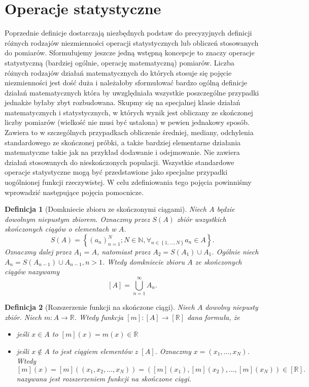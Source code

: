\documentclass[12pt,a4paper]{report}
\newtheorem{definition}{Definicja}[chapter]
\newcommand{\zbior}[1]{\left\lbrace {#1} \right\rbrace }
\newcommand{\domkniecie}[1]{\left\lbrack{#1}\right\rbrack}
\begin{document}
\section{Operacje statystyczne}
Poprzednie definicje dostarczają niezbędnych podstaw do precyzyjnych definicji różnych rodzajów niezmienności operacji statystycznych lub obliczeń stosowanych do pomiarów. Sformułujemy jeszcze jedną wstępną koncepcje to znaczy operacje statystyczną  (bardziej ogólnie, operację matematyczną) pomiarów. Liczba różnych rodzajów działań matematycznych  do których stosuje się pojęcie niezmienności jest dość duża i należałoby sformułować bardzo ogólną definicje działań matematycznych która by uwzględniała wszystkie poszczególne przypadki jednakże byłaby zbyt rozbudowana. Skupmy się na specjalnej klasie działań matematycznych i statystycznych, w których wynik jest obliczany ze skończonej liczby pomiarów (wielkość nie musi być ustalona) w pewien jednakowy sposób. Zawiera to w szczególnych przypadkach obliczenie średniej, mediany, odchylenia standardowego ze skończonej próbki, a także bardziej elementarne działania matematyczne takie jak na przykład dodawanie i odejmowanie. Nie zawiera działań stosowanych do nieskończonych populacji. Wszystkie standardowe operacje statystyczne mogą być przedstawione jako specjalne przypadki uogólnionej funkcji rzeczywistej. W celu zdefiniowania tego pojęcia powinniśmy wprowadzić następujące pojęcia pomocnicze. 
\begin{definition}[Domkniecie zbioru ze skończonymi ciągami]
Niech $A$ będzie dowolnym niepustym zbiorem. Oznaczmy przez $S(A)$ zbiór wszystkich skończonych ciągów o elementach w $A$.
$$
S(A)=\zbior{(a_n)^{N}_{n=1}; N\in \mathbb{N}, \forall_{n\in \zbior{1,\dots,N}} a_n \in A}.
$$
Oznaczmy dalej przez $A_1 =A$, natomiast przez $A_2 = S(A_1) \cup A_1$. Ogólnie niech $A_n = S(A_{n-1})\cup A_{n-1}, n>1$. Wtedy domkniecie zbioru $A$ ze skończonych ciągów nazywamy
$$
\domkniecie{A}=\bigcup^{\infty}_{n=1} A_n.
$$ 
\end{definition}
\begin{definition}[Rozszerzenie funkcji na skończone ciągi]
Niech $A$ dowolny niepusty zbiór. Niech $m:A\to \mathbb{R}$. Wtedy funkcja $\domkniecie{m}:\domkniecie{A}\to \domkniecie{\mathbb{R}}$ dana formuła, że
\begin{itemize}
\item jeśli $x\in A$ to $\domkniecie{m}(x) =m(x) \in \mathbb{R}$
\item jeśli $x\notin A$ to jest ciągiem elementów z $\domkniecie{A}$. Oznaczmy $x=(x_1,\dots,x_N)$. Wtedy 
$$
\domkniecie{m}(x)=\domkniecie{m}((x_1,x_2,\dots,x_N))=(\domkniecie{m}(x_1),\domkniecie{m}(x_2),\dots, \domkniecie{m}(x_N))\in \domkniecie{\mathbb{R}}.
$$
nazywana jest rozszerzeniem funkcji na skończone ciągi.
\end{itemize}
\end{definition}
\end{document}
